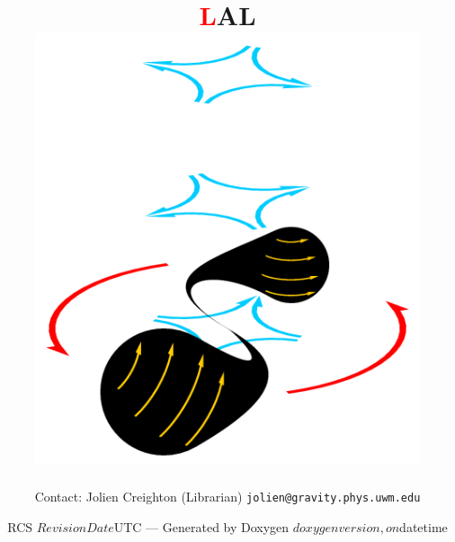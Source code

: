 \documentclass{article}
\def\rcs#1{\def\next##1#1{\mbox{##1}}\next}
\begin{document}



\title{
\sffamily\bfseries\Huge
\textcolor{red}{\lsdfont L}AL
\hspace{-2em}
\\[\bigskipamount]
\includegraphics[height=5in]{merger}
}
\author{Contact: Jolien Creighton (Librarian) \texttt{jolien@gravity.phys.uwm.edu}}
\date{RCS \rcs$Revision$\rcs$Date$UTC --- 
Generated by Doxygen $doxygenversion, on $datetime}

\maketitle

\newpage
\nopagebreak
\tableofcontents

\clearemptydoublepage
{}
\end{document}
